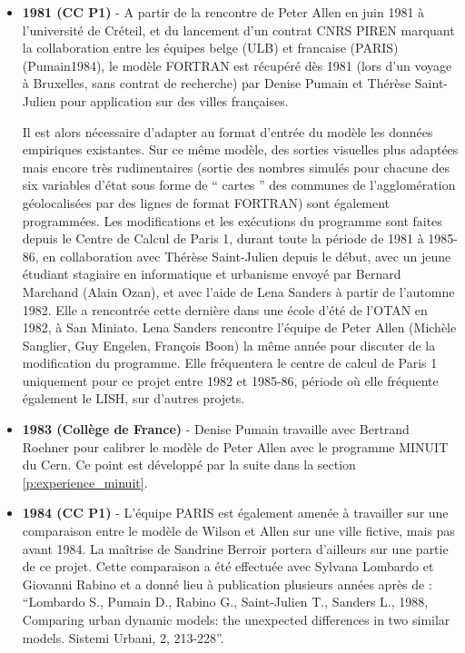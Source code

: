 \begin{itemize}[label=\textbullet]

\item \textbf{1981 (CC P1)} - A partir de la rencontre  de Peter Allen en juin 1981 à l’université de Créteil, et du lancement d’un contrat CNRS PIREN marquant la collaboration entre les équipes belge (ULB) et francaise (PARIS) (Pumain1984), le modèle FORTRAN est récupéré dès 1981 (lors d’un voyage à Bruxelles, sans contrat de recherche) par Denise Pumain et Thérèse Saint-Julien pour application sur des villes françaises.

Il est alors nécessaire d’adapter au format d’entrée du modèle les données empiriques existantes. Sur ce même modèle, des sorties visuelles plus adaptées mais encore très rudimentaires (sortie des nombres simulés pour chacune des six variables d’état sous forme de \enquote{ cartes } des communes de l’agglomération géolocalisées par des lignes de format FORTRAN) sont également programmées. Les modifications et les exécutions du programme sont faites depuis le Centre de Calcul de Paris 1, durant toute la période de 1981 à 1985-86, en collaboration avec Thérèse Saint-Julien depuis le début, avec un jeune étudiant stagiaire en informatique et urbanisme envoyé par Bernard Marchand (Alain Ozan), et avec l’aide de Lena Sanders à partir de l’automne 1982. Elle a rencontrée cette dernière dans une école d'été de l'OTAN en 1982, à San Miniato. Lena Sanders rencontre l'équipe de Peter Allen (Michèle Sanglier, Guy Engelen, François Boon) la même année pour discuter de la modification du programme. Elle fréquentera le centre de calcul de Paris 1 uniquement pour ce projet entre 1982 et 1985-86, période où elle fréquente également le LISH, sur d'autres projets.

\item \textbf{1983 (Collège de France)} - Denise Pumain travaille avec Bertrand Roehner pour calibrer le modèle de Peter Allen avec le programme MINUIT du Cern. Ce point est développé par la suite dans la section \ref{p:experience_minuit}.

\item \textbf{1984 (CC P1)} - L'équipe PARIS est également amenée à travailler sur une comparaison entre le modèle de Wilson et Allen sur une ville fictive, mais pas avant 1984. La maîtrise de Sandrine Berroir portera d'ailleurs sur une partie de ce projet. Cette comparaison a été effectuée avec Sylvana Lombardo et Giovanni Rabino et a donné lieu à publication plusieurs années après de \autocite{Sylvana1988} : \foreignquote{english}{Lombardo S., Pumain D., Rabino G., Saint-Julien T., Sanders L., 1988, Comparing urban dynamic models: the unexpected differences in two similar models. Sistemi Urbani, 2, 213-228}.


\end{itemize}
